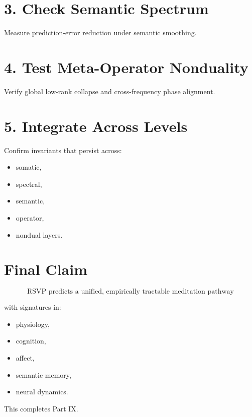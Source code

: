 \documentclass[12pt]{article}
\begin{document}
\section{3. Check Semantic Spectrum}

Measure prediction-error reduction under semantic smoothing.

\section{4. Test Meta-Operator Nonduality}

Verify global low-rank collapse and cross-frequency phase alignment.

\section{5. Integrate Across Levels}

Confirm invariants that persist across:

\begin{itemize}
    \item somatic,
    \item spectral,
    \item semantic,
    \item operator,
    \item nondual layers.
\end{itemize}

\section{Final Claim}

\[
\boxed{
\text{RSVP predicts a unified, empirically tractable meditation pathway}
}
\]

with signatures in:

\begin{itemize}
    \item physiology,
    \item cognition,
    \item affect,
    \item semantic memory,
    \item neural dynamics.
\end{itemize}

This completes Part IX.


\end{document}
